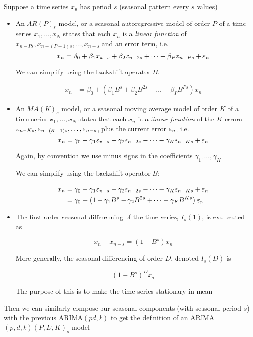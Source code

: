 Suppose a time series $x_n$ has period $s$ (seasonal pattern every $s$ values)
\begin{itemize}

\item An $AR(P)_s$ model, or a seasonal autoregressive model of order $P$ of a time series $x_1,\dots,x_N$ states that each $x_n$ is a \textit{linear function} of $x_{n-Ps},x_{n-(P-1)s},\dots,x_{n-s}$ and an error term, i.e. 
$$x_n= \beta_0+\beta_1 x_{n-s}+\beta_2 x_{n-2s} +\dots + \beta_P x_{n-Ps}+\varepsilon_n$$

We can simplify using the backshift operator $B$:

\begin{align}
x_n &= \beta_0+\left(\beta_1 B^s+\beta_2 B^{2s} +\dots + \beta_P B^{Ps}\right)x_n
\end{align}

\item An $MA(K)_s$ model, or a seasonal moving average model of order $K$ of a time series $x_1,\dots,x_N$ states that each $x_n$ is a \textit{linear function} of the $K$ errors $\varepsilon_{n-Ks},\varepsilon_{n-(K-1)s},\dots,\varepsilon_{n-s}$, plus the current error $\varepsilon_n$, i.e. 
$$x_n= \gamma_0-\gamma_1 \varepsilon_{n-s}-\gamma_2 \varepsilon_{n-2s} -\dots - \gamma_K \varepsilon_{n-Ks}+\varepsilon_n$$

Again, by convention we use minus signs in the coefficients $\gamma_1,\dots,\gamma_K$

We can simplify using the backshift operator $B$:

\begin{align}
x_n
&= \gamma_0-\gamma_1 \varepsilon_{n-s}-\gamma_2 \varepsilon_{n-2s} -\dots - \gamma_K \varepsilon_{n-Ks}+\varepsilon_n \nonumber \\
&= \gamma_0+\left(1-\gamma_1 B^s-\gamma_2 B^{2s} +\dots - \gamma_K B^{Ks}\right)\varepsilon_n 
\end{align}

\item The first order seasonal differencing of the time series, $I_s(1)$, is evalueated as 

$$x_n-x_{n-s}=\left(1-B^s\right)x_n$$

More generally, the seasonal differencing of order $D$, denoted $I_s(D)$ is 

$$(1-B^s)^D x_n$$

The purpose of this is to make the time series  stationary in mean
\end{itemize}


Then we can similarly compose our seasonal components (with seasonal period $s$) with the previous ARIMA$(pd,k)$ to get the definition of an ARIMA$(p,d,k)(P,D,K)_s$ model

